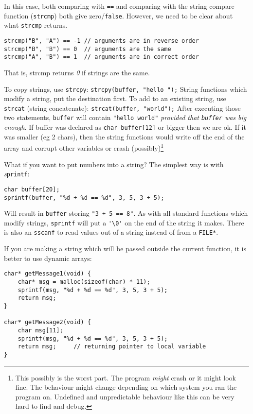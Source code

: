 In this case, both comparing with \texttt{==} and comparing with the string compare function (\texttt{strcmp}) both give zero/\lstinline!false!.
However, we need to be clear about what \texttt{strcmp} returns.
\begin{lstlisting}
strcmp("B", "A") == -1 // arguments are in reverse order
strcmp("B", "B") == 0  // arguments are the same
strcmp("A", "B") == 1  // arguments are in correct order
\end{lstlisting}
That is, strcmp returns \emph{0} if strings are the same.

To copy strings, use \texttt{strcpy}:
\lstinline{strcpy(buffer, "hello ");}
String functions which modify a string, put the destination first.
To add to an existing string, use \texttt{strcat} (string concatenate):
\lstinline{strcat(buffer, "world");}
After executing those two statements, \texttt{buffer} will contain \lstinline!"hello world"! \emph{provided that \texttt{buffer} was big enough}.
If buffer was declared as \lstinline!char buffer[12]! or bigger then we are ok.
If it was smaller (eg 2 chars), then the string functions would write off the end of the array and corrupt other variables or crash (possibly)\footnote{This possibly is the worst part.
The program \emph{might} crash or it might look fine.
The behaviour might change depending on which system you ran the program on.
Undefined and unpredictable behaviour like this can be very hard to find and debug.}

What if you want to put numbers into a string? 
The simplest way is with \emph{s}\texttt{printf}:
\begin{lstlisting}
char buffer[20];
sprintf(buffer, "%d + %d == %d", 3, 5, 3 + 5);
\end{lstlisting}
Will result in \texttt{buffer} storing \lstinline!"3 + 5 == 8"!.
As with all standard functions which modify strings, \texttt{sprintf} will put a \lstinline!'\0'! on the end of the string it makes.
There is also an \texttt{sscanf} to read values out of a string instead of from a \texttt{FILE*}.

If you are making a string which will be passed outside the current function, it is better to use dynamic arrays:
\begin{lstlisting}
char* getMessage1(void) {
    char* msg = malloc(sizeof(char) * 11);
    sprintf(msg, "%d + %d == %d", 3, 5, 3 + 5);
    return msg;
}

char* getMessage2(void) {
    char msg[11];
    sprintf(msg, "%d + %d == %d", 3, 5, 3 + 5);
    return msg;		// returning pointer to local variable
}
\end{lstlisting}

